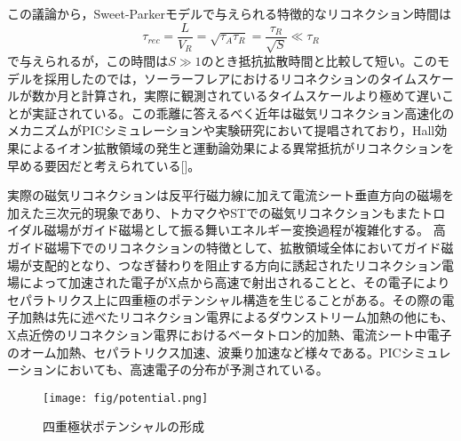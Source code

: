 この議論から，Sweet-Parkerモデルで与えられる特徴的なリコネクション時間は
\begin{equation}
\tau_{rec}=\frac{L}{V_R}=\sqrt{\tau_A\tau_R}=\frac{\tau_R}{\sqrt{S}}\ll\tau_R
\end{equation}
で与えられるが，この時間は$S\gg1$のとき抵抗拡散時間と比較して短い。このモデルを採用したのでは，ソーラーフレアにおけるリコネクションのタイムスケールが数か月と計算され，実際に観測されているタイムスケールより極めて遅いことが実証されている。この乖離に答えるべく近年は磁気リコネクション高速化のメカニズムがPICシミュレーションや実験研究において提唱されており，Hall効果によるイオン拡散領域の発生と運動論効果による異常抵抗がリコネクションを早める要因だと考えられている[]。


実際の磁気リコネクションは反平行磁力線に加えて電流シート垂直方向の磁場を加えた三次元的現象であり、トカマクやSTでの磁気リコネクションもまたトロイダル磁場がガイド磁場として振る舞いエネルギー変換過程が複雑化する。
高ガイド磁場下でのリコネクションの特徴として、拡散領域全体においてガイド磁場が支配的となり、つなぎ替わりを阻止する方向に誘起されたリコネクション電場によって加速された電子がX点から高速で射出されることと、その電子によりセパラトリクス上に四重極のポテンシャル構造を生じることがある\cite{3drecon}。その際の電子加熱は先に述べたリコネクション電界によるダウンストリーム加熱の他にも、X点近傍のリコネクション電界におけるベータトロン的加熱、電流シート中電子のオーム加熱、セパラトリクス加速\cite{separatrics}、波乗り加速\cite{surf}など様々である。PICシミュレーションにおいても、高速電子の分布が予測されている。

\begin{figure}[H]
	 \centering
	 \texttt{[image: fig/potential.png]}
	 \caption{四重極状ポテンシャルの形成}
	 \label{fig:reconection}
\end{figure}

